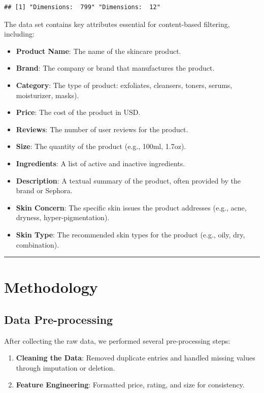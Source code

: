 \documentclass[
]{article}
\providecommand{\tightlist}{%
  \setlength{\itemsep}{0pt}\setlength{\parskip}{0pt}}
\begin{document}
\begin{verbatim}
## [1] "Dimensions:  799" "Dimensions:  12"
\end{verbatim}

The data set contains key attributes essential for content-based
filtering, including:

\begin{itemize}
\tightlist
\item
  \textbf{Product Name}: The name of the skincare product.
\item
  \textbf{Brand}: The company or brand that manufactures the product.
\item
  \textbf{Category}: The type of product: exfoliates, cleansers, toners,
  serums, moisturizer, masks).
\item
  \textbf{Price}: The cost of the product in USD.
\item
  \textbf{Reviews}: The number of user reviews for the product.
\item
  \textbf{Size}: The quantity of the product (e.g., 100ml, 1.7oz).
\item
  \textbf{Ingredients}: A list of active and inactive ingredients.
\item
  \textbf{Description}: A textual summary of the product, often provided
  by the brand or Sephora.
\item
  \textbf{Skin Concern}: The specific skin issues the product addresses
  (e.g., acne, dryness, hyper-pigmentation).
\item
  \textbf{Skin Type}: The recommended skin types for the product (e.g.,
  oily, dry, combination).
\end{itemize}

\begin{center}\rule{0.5\linewidth}{0.5pt}\end{center}

\section{Methodology}\label{methodology}

\subsection{Data Pre-processing}\label{data-pre-processing}

After collecting the raw data, we performed several pre-processing
steps:

\begin{enumerate}
\def\labelenumi{\arabic{enumi}.}
\item
  \textbf{Cleaning the Data}: Removed duplicate entries and handled
  missing values through imputation or deletion.
\item
  \textbf{Feature Engineering}: Formatted price, rating, and size for
  consistency.
\end{enumerate}
\end{document}
